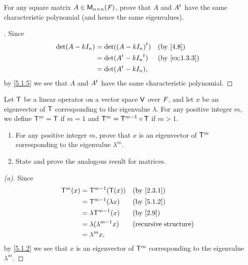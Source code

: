 \begin{ex}\label{ex:5.1.14}
	For any square matrix \(A \in \mathsf{M}_{{n} \times n}({\mathit{F}})\), prove that \(A\) and \({A}^{t}\) have the same characteristic polynomial (and hence the same eigenvalues).
\end{ex}

\begin{proof}[]
	Since
	\begin{align*}
		\det(A - k I_n) & = \det(\tp{(A - k I_n)})    &  & \by{4.8}      \\
		                & = \det(\tp{A} - k \tp{I_n}) &  & \by{ex:1.3.3} \\
		                & = \det(\tp{A} - k I_n),
	\end{align*}
	by \cref{5.1.5} we see that \(A\) and \({A}^{t}\) have the same characteristic polynomial.
\end{proof}

\begin{ex}\label{ex:5.1.15}
	Let \(\mathsf{T}\) be a linear operator on a vector space \(\mathsf{V}\) over \(\mathit{F}\), and let \(x\) be an eigenvector of \(\mathsf{T}\) corresponding to the eigenvalue \(\lambda\).
	For any positive integer \(m\), we define \(\mathsf{T}^m = \mathsf{T}\) if \(m = 1\) and \(\mathsf{T}^m = \mathsf{T}^{m - 1} \circ \mathsf{T}\) if \(m > 1\).
	\begin{enumerate}
		\item For any positive integer \(m\), prove that \(x\) is an eigenvector of \(\mathsf{T}^m\) corresponding to the eigenvalue \(\lambda^m\).
		\item State and prove the analogous result for matrices.
	\end{enumerate}
\end{ex}

\begin{proof}[(a)]
	Since
	\begin{align*}
		\T^m(x) & = \T^{m - 1}(\T(x))           &  & \by{2.3.1}                   \\
		        & = \T^{m - 1}(\lambda x)       &  & \by{5.1.2}                   \\
		        & = \lambda \T^{m - 1}(x)       &  & \by{2.9}                     \\
		        & = \lambda (\lambda^{m - 1} x) &  & \text{(recursive structure)} \\
		        & = \lambda^m x,
	\end{align*}
	by \cref{5.1.2} we see that \(x\) is an eigenvector of \(\mathsf{T}^m\) corresponding to the eigenvalue \(\lambda^m\).
\end{proof}

